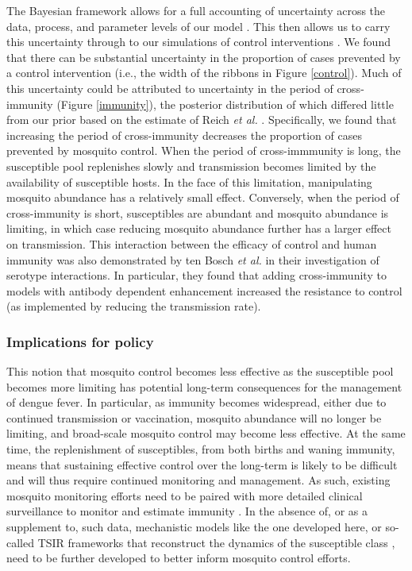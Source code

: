 \documentclass[10pt,letterpaper]{article}
\begin{document}
The Bayesian framework allows for a full accounting of uncertainty across the data, process, and parameter levels of our model \cite{Berliner1996}.
This then allows us to carry this uncertainty through to our simulations of control interventions \cite{Elderd2006}.
We found that there can be substantial uncertainty in the proportion of cases prevented by a control intervention (i.e., the width of the ribbons in Figure \ref{control}).
Much of this uncertainty could be attributed to uncertainty in the period of cross-immunity (Figure \ref{immunity}), the posterior distribution of which differed little from our prior based on the estimate of Reich \emph{et al.} \cite{Reich2013}.
Specifically, we found that increasing the period of cross-immunity decreases the proportion of cases prevented by mosquito control.
When the period of cross-immmunity is long, the susceptible pool replenishes slowly and transmission becomes limited by the availability of susceptible hosts.
In the face of this limitation, manipulating mosquito abundance has a relatively small effect.
Conversely, when the period of cross-immunity is short, susceptibles are abundant and mosquito abundance is limiting, in which case reducing mosquito abundance further has a larger effect on transmission.
This interaction between the efficacy of control and human immunity was also demonstrated by ten Bosch \emph{et al.} \cite{TenBosch2016} in their investigation of serotype interactions.
In particular, they found that adding cross-immunity to models with antibody dependent enhancement increased the resistance to control (as implemented by reducing the transmission rate).

\subsubsection{Implications for policy}

This notion that mosquito control becomes less effective as the susceptible pool becomes more limiting has potential long-term consequences for the management of dengue fever.
In particular, as immunity becomes widespread, either due to continued transmission or vaccination, mosquito abundance will no longer be limiting, and broad-scale mosquito control may become less effective.
At the same time, the replenishment of susceptibles, from both births and waning immunity, means that sustaining effective control over the long-term is likely to be difficult \cite{Scott2010b} and will thus require continued monitoring and management.
As such, existing mosquito monitoring efforts need to be paired with more detailed clinical surveillance to monitor and estimate immunity \cite{Morrison2008}.
In the absence of, or as a supplement to, such data, mechanistic models like the one developed here, or so-called TSIR frameworks that reconstruct the dynamics of the susceptible class \cite{Finkenstadt2000, Reich2013}, need to be further developed to better inform mosquito control efforts.
\end{document}
